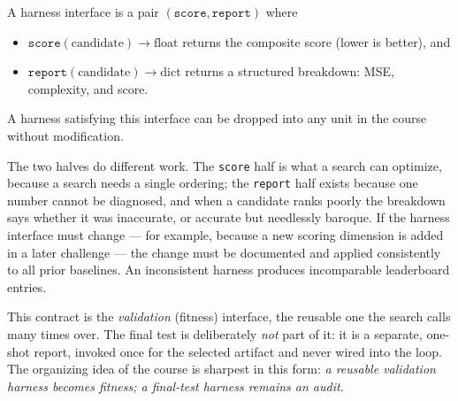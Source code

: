 \begin{definition}
\label{definition:HarnessContract}
A harness interface is a pair $(\texttt{score}, \texttt{report})$ where
\begin{itemize}
\item $\texttt{score}(\text{candidate}) \to \text{float}$ returns the composite score (lower is better), and
\item $\texttt{report}(\text{candidate}) \to \text{dict}$ returns a structured breakdown: MSE, complexity, and score.
\end{itemize}
A harness satisfying this interface can be dropped into any unit in the course without modification.
\end{definition}

The two halves do different work.
The \texttt{score} half is what a search can optimize, because a search needs a single ordering; the \texttt{report} half exists because one number cannot be diagnosed, and when a candidate ranks poorly the breakdown says whether it was inaccurate, or accurate but needlessly baroque.
If the harness interface must change — for example, because a new scoring dimension is added in a later challenge — the change must be documented and applied consistently to all prior baselines.
An inconsistent harness produces incomparable leaderboard entries.

This contract is the \emph{validation} (fitness) interface, the reusable one the search calls many times over.
The final test is deliberately \emph{not} part of it: it is a separate, one-shot report, invoked once for the selected artifact and never wired into the loop.
The organizing idea of the course is sharpest in this form: \emph{a reusable validation harness becomes fitness; a final-test harness remains an audit.}

